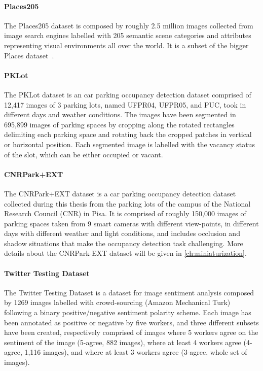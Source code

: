 \paragraph{Places205~\cite{zhou2014learning}}
The Places205 dataset is composed by roughly 2.5 million images collected from image search engines labelled with 205 semantic scene categories and attributes representing visual environments all over the world.
It is a subset of the bigger Places dataset~\cite{zhou2016places}.

\paragraph{PKLot~\cite{de2015pklot}}
The PKLot dataset is an car parking occupancy detection dataset comprised of 12,417 images of 3 parking lots, named UFPR04, UFPR05, and PUC, took in different days and weather conditions.
The images have been segmented in 695,899 images of parking spaces by cropping along the rotated rectangles delimiting each parking space and rotating back the cropped patches in vertical or horizontal position.
Each segmented image is labelled with the vacancy status of the slot, which can be either occupied or vacant.

\paragraph{CNRPark+EXT~\cite{amato2016car,amato2017deep}}
The CNRPark+EXT dataset is a car parking occupancy detection dataset collected during this thesis from the parking lots of the campus of the National Research Council (CNR) in Pisa.
It is comprised of roughly 150,000 images of parking spaces taken from 9 smart cameras with different view-points, in different days with different weather and light conditions, and includes occlusion and shadow situations that make the occupancy detection task challenging.
More details about the CNRPark-EXT dataset will
be given in \ref{ch:miniaturization}.

\paragraph{Twitter Testing Dataset~\cite{you2015robust}}
The Twitter Testing Dataset is a dataset for image sentiment analysis composed by 1269 images labelled with crowd-sourcing (Amazon Mechanical Turk) following a binary positive/negative sentiment polarity scheme.
Each image has been annotated as positive or negative by five workers, and three different subsets have been created, respectively comprised of images where 5 workers agree on the sentiment of the image (5-agree, 882 images), where at least 4 workers agree (4-agree, 1,116 images), and where at least 3 workers agree (3-agree, whole set of images).

